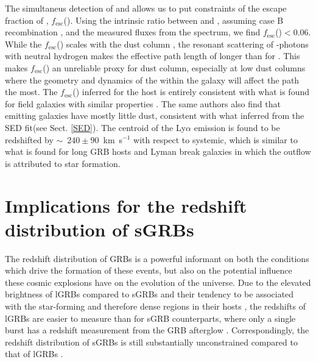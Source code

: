 \documentclass{aa}    %
\begin{document}
The simultaneus detection of \lya{} and \ha{} allows us to put constraints of
the escape fraction of \lya{}, $f_{\mathrm{esc}}$(\lya). Using the intrinsic
ratio between \ha{} and \lya{}, assuming case B recombination
\citep{Brocklehurst1971}, and the measured fluxes from the spectrum, we find
$f_{\mathrm{esc}}$(\lya)$ < 0.06$. While the $f_{\mathrm{esc}}$(\lya) scales
with the dust column \citep{Hayes2011}, the resonant scattering of
\lya{}-photons with neutral hydrogen makes the effective path length of \lya{}
longer than for \ha{} \citep{Atek2009}. This makes $f_{\mathrm{esc}}$(\lya) an
unreliable proxy for dust column, especially at low dust columns
\citep{Atek2014} where the geometry and dynamics of the \hi{} within the galaxy
will affect the \lya{} path the most. The $f_{\mathrm{esc}}$(\lya) inferred for
the host is entirely consistent with what is found for field galaxies with
similar properties \citep{Oyarzun2017}. The same authors also find that \lya{}
emitting galaxies have mostly little dust, consistent with what inferred from
the SED fit(see Sect. \ref{SED}). The centroid of the Ly$\alpha$ emission is
found to be redshifted by $\sim$~$240\pm 90$~km~s$^{-1}$ with respect to
systemic, which is similar to what is found for long GRB hosts
\citep{Milvang-Jensen2012a} and Lyman break galaxies \citep{Shapley2003a} in
which the outflow is attributed to star formation.

\section{Implications for the redshift distribution of sGRBs}


The redshift distribution of GRBs is a powerful informant on both the conditions
which drive the formation of these events, but also on the potential influence
these cosmic explosions have on the evolution of the universe. Due to the
elevated brightness of lGRBs compared to sGRBs \citep{Berger2014} and their
tendency to be associated with the star-forming and therefore dense regions in
their hosts \citep{Fruchter2006, Lyman2017}, the redshifts of lGRBs are easier
to measure than for sGRB counterparts, where only a single burst has a redshift
measurement from the GRB afterglow \citep{Cucchiara2013, DeUgartePostigo2014c}.
Correspondingly, the redshift distribution of sGRBs is still substantially
unconstrained compared to that of lGRBs \citep[e.g., see][]{Jakobsson2012a,
	DAvanzo2015, Perley2016d}.
\end{document}
